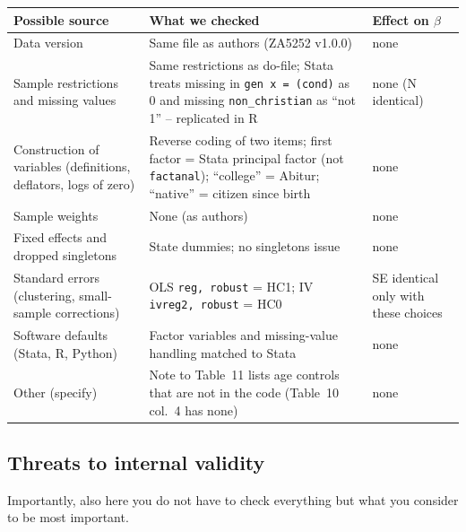 \documentclass[12pt,a4paper]{article}
\renewcommand{\arraystretch}{1.25}
\begin{document}
{\renewcommand{\arraystretch}{1.4}%
\begin{tabularx}{\textwidth}{@{}>{\raggedright\arraybackslash}p{}L>{\raggedright\arraybackslash}p{0.15\textwidth}@{}}
\toprule
Possible source & What we checked & Effect on $\beta$ \\
\midrule
Data version & Same file as authors (ZA5252 v1.0.0) & none \\
Sample restrictions and missing values & Same restrictions as do-file; Stata treats missing in \texttt{gen x = (cond)} as 0 and missing \texttt{non\_christian} as ``not 1'' -- replicated in R & none (N identical) \\
Construction of variables (definitions, deflators, logs of zero) & Reverse coding of two items; first factor = Stata principal factor (not \texttt{factanal}); ``college'' = Abitur; ``native'' = citizen since birth & none \\
Sample weights & None (as authors) & none \\
Fixed effects and dropped singletons & State dummies; no singletons issue & none \\
Standard errors (clustering, small-sample corrections) & OLS \texttt{reg, robust} = HC1; IV \texttt{ivreg2, robust} = HC0 & SE identical only with these choices \\
Software defaults (Stata, R, Python) & Factor variables and missing-value handling matched to Stata & none \\
Other (specify) & Note to Table~11 lists age controls that are not in the code (Table~10 col.\ 4 has none) & none \\
\bottomrule
\end{tabularx}}

\subsection{Threats to internal validity}

Importantly, also here you do not have to check everything but what you consider to be most important.
\end{document}
